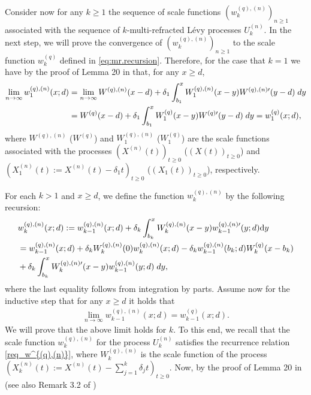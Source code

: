\documentclass[12pt,reqno]{amsart}
\newcommand{\red}{\textcolor[rgb]{1.00,0.00,0.00}}
\newcommand{\blue}{\textcolor[rgb]{0.00,0.00,1.00}}
\theoremstyle{definition}
\theoremstyle{remark}
\newcommand{\md}{\mathrm{d}}
\begin{document}
Consider now for any $k\geq 1$ the sequence of scale functions $(w^{(q),(n)}_k)_{n\geq 1}$ 
 associated with the sequence of $k$-multi-refracted 
L\'evy processes $U^{(n)}_k$. In the next step, we will prove the convergence of $(w^{(q),(n)}_k)_{n\geq 1}$  to the scale function $w^{(q)}_k$ 
defined in \eqref{eq:mr.recursion}.
Therefore, for the case that $k=1$ we have by the proof of Lemma 20 in \cite{kyprianouloeffen2010} that, for any $x\geq d$,
\begin{align}\label{sf_ub_1}
\lim_{n\to\infty}w^{(q),(n)}_1(x;d)&=\lim_{n\to\infty}W^{(q),(n)}(x-d)+\delta_1\int_{b_1}^{x}W_1^{(q),(n)}(x-y)W^{(q),(n)\prime}(y-d)\;dy\notag\\
&=W^{(q)}(x-d)+\delta_1\int_{b_1}^{x}W_1^{(q)}(x-y)W^{(q)\prime}(y-d)\;dy=w_1^{(q)}(x;d),
\end{align}
where $W^{(q),(n)}$ ($W^{(q)}$) and $W_1^{(q),(n)}$ ($W_1^{(q)}$) are the scale functions associated with the processes $(X^{(n)}(t))_{t\geq0}$ ($(X(t))_{t\geq0}$) and 
$(X_1^{(n)}(t):=X^{(n)}(t)-\delta_1 t)_{t\geq0}$ ($(X_1(t))_{t\geq0}$), respectively.  
\par For each $k>1$ and $x\geq d$, we define the function $w^{(q),(n)}_k$ by the following recursion:
\begin{align}\label{req_w^{(q),(n)}}\nonumber
 &w^{(q),(n)}_k(x;d):= w^{(q),(n)}_{k-1}(x;d)+\delta_{k}\int^{x}_{b_{k}}W_k^{(q),(n)}(x-y)w_{k-1}^{(q),(n)\prime}(y;d)\md y\\\nonumber&=
w^{(q),(n)}_{k-1}(x;d)+\delta_k W_k^{(q),(n)}(0)w^{(q),(n)}_k(x;d)-\delta_k w_{k-1}^{(q),(n)}(b_k;d)W_k^{(q)}(x-b_k)\\&
+\delta_k \int_{b_k}^x W_k^{(q),(n)\prime}(x-y)w_{k-1}^{(q),(n)}(y;d)\;dy,
\end{align}
where the last equality follows from integration by parts. 
Assume now for the inductive step  that for any $x\geq d$ it holds that
\begin{align*}
\lim_{n\to\infty}w^{(q),(n)}_{k-1}(x;d)=w_{k-1}^{(q)}(x;d).
\end{align*}
We will prove that the above limit holds for $k$. To this end, we recall that the scale function $w^{(q),(n)}_k$ for the process $U^{(n)}_k$ 
satisfies the recurrence relation \eqref{req_w^{(q),(n)}}, where $W^{(q),(n)}_k$ is the scale function of the process 
$(X_k^{(n)}(t):=X^{(n)}(t)-\sum_{j=1}^k\delta_j t)_{t\geq0}$.
Now, by the proof of Lemma 20 in \cite{kyprianouloeffen2010} (see also Remark 3.2 of \cite{perezyamazaki2017}) 
\end{document}
